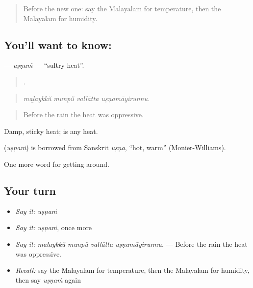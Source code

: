 \label{lesson:ML-C509-usnam}



\begin{quote}
Before the new one: say the Malayalam for temperature, then the Malayalam for humidity.
\end{quote}

\subsection*{You'll want to know: }
\textbf{} — \emph{uṣṇaṁ} — \textquotedblleft{}sultry heat\textquotedblright{}.

\begin{quote}
   .
\end{quote}

\begin{quote}
\emph{maḻaykkŭ munpŭ vallātta uṣṇamāyirunnu.}
\end{quote}

\begin{quote}
Before the rain the heat was oppressive.
\end{quote}

Damp, sticky heat;  is any heat.

\begin{cousinweb}
\textbf{} (\emph{uṣṇaṁ}) is borrowed from Sanskrit \emph{uṣṇa}, \textquotedblleft{}hot, warm\textquotedblright{} (Monier-Williams).
\end{cousinweb}

\begin{grammarlens}[title={What you've built}]
One more word for getting around.
\end{grammarlens}

\subsection*{Your turn}
\begin{itemize}
\raggedright
  \item \emph{Say it:} \emph{uṣṇaṁ}
  \item \emph{Say it:} \emph{uṣṇaṁ}, once more
  \item \emph{Say it:} \emph{maḻaykkŭ munpŭ vallātta uṣṇamāyirunnu.} — Before the rain the heat was oppressive.
  \item \emph{Recall:} say the Malayalam for temperature, then the Malayalam for humidity, then say \emph{uṣṇaṁ} again
\end{itemize}

